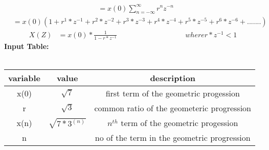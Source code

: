 \documentclass[a4,12pt,onecolumn]{IEEEtran}
\begin{document}
\begin{align}&=x(0)\sum_{n=-\infty}^{\infty} r^nz^{-n} \end{align} 
\begin{align}&= x(0)(1+r^1*z^{-1}+r^2*z^{-2}+r^3*z^{-3}+r^4*z^{-4}+r^5*z^{-5}+r^6*z^{-6}+.......)\end{align} 
\begin{align}X(Z)&=x(0)*\frac{1}{1-r*z^{-1}}\hspace{4cm}where r*z^{-1}<1\end{align} 
\textbf{Input Table:}\\
\\
\begin{center}
\begin{tabular}{|c|c|c|}
   \hline
   variable&value&description  \\
   \hline
   x(0) & $ \sqrt{7} $& first term of the geometric progession\\
   \hline
   r & $\sqrt{3}$ & common ratio of the geometeric progression\\
   \hline
   x(n) & $\sqrt{7*3^{(n)}}$& $n^{th}$ term of the geometric progession\\
   \hline
   n& &no of the term in the geometric progression\\
   \hline
  
\end{tabular}
\end{center}
\end{document}
